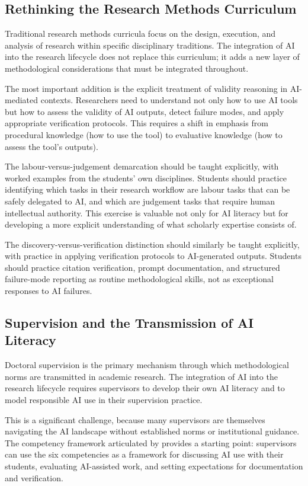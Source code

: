 \documentclass[12pt, a4paper]{article}
\begin{document}
\subsection{Rethinking the Research Methods Curriculum}

Traditional research methods curricula focus on the design, execution, and analysis of research within specific disciplinary traditions. The integration of AI into the research lifecycle does not replace this curriculum; it adds a new layer of methodological considerations that must be integrated throughout.

The most important addition is the explicit treatment of validity reasoning in AI-mediated contexts. Researchers need to understand not only how to use AI tools but how to assess the validity of AI outputs, detect failure modes, and apply appropriate verification protocols. This requires a shift in emphasis from procedural knowledge (how to use the tool) to evaluative knowledge (how to assess the tool's outputs).

The labour-versus-judgement demarcation should be taught explicitly, with worked examples from the students' own disciplines. Students should practice identifying which tasks in their research workflow are labour tasks that can be safely delegated to AI, and which are judgement tasks that require human intellectual authority. This exercise is valuable not only for AI literacy but for developing a more explicit understanding of what scholarly expertise consists of.

The discovery-versus-verification distinction should similarly be taught explicitly, with practice in applying verification protocols to AI-generated outputs. Students should practice citation verification, prompt documentation, and structured failure-mode reporting as routine methodological skills, not as exceptional responses to AI failures.

\subsection{Supervision and the Transmission of AI Literacy}

Doctoral supervision is the primary mechanism through which methodological norms are transmitted in academic research. The integration of AI into the research lifecycle requires supervisors to develop their own AI literacy and to model responsible AI use in their supervision practice.

This is a significant challenge, because many supervisors are themselves navigating the AI landscape without established norms or institutional guidance. The competency framework articulated by \citet{zyphur2026responsible} provides a starting point: supervisors can use the six competencies as a framework for discussing AI use with their students, evaluating AI-assisted work, and setting expectations for documentation and verification.
\end{document}
